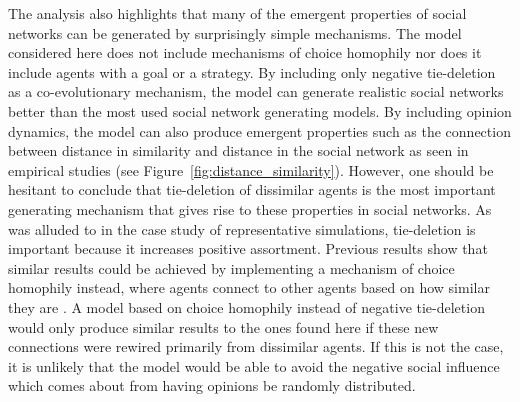 \documentclass[11pt]{article}
\begin{document}
\noindent The analysis also highlights that many of the emergent properties of social networks can be generated by surprisingly simple mechanisms. The model considered here does not include mechanisms of choice homophily nor does it include agents with a goal or a strategy. By including only negative tie-deletion as a co-evolutionary mechanism, the model can generate realistic social networks better than the most used social network generating models. By including opinion dynamics, the model can also produce emergent properties such as the connection between distance in similarity and distance in the social network as seen in empirical studies \cite{kossinets_origins_2009} (see Figure~\ref{fig:distance_similarity}). However, one should be hesitant to conclude that tie-deletion of dissimilar agents is the most important generating mechanism that gives rise to these properties in social networks. As was alluded to in the case study of representative simulations, tie-deletion is important because it increases positive assortment. Previous results show that similar results could be achieved by implementing a mechanism of choice homophily instead, where agents connect to other agents based on how similar they are \cite{asikainen_cumulative_2020}. A model based on choice homophily instead of negative tie-deletion would only produce similar results to the ones found here if these new connections were rewired primarily from dissimilar agents. If this is not the case, it is unlikely that the model would be able to avoid the negative social influence which comes about from having opinions be randomly distributed. 
\end{document}
